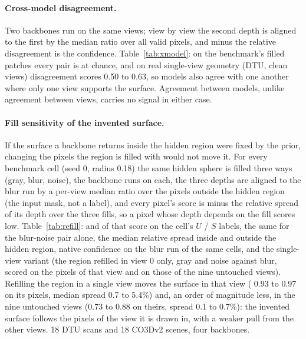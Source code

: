 \begin{table}[h]
\centering
\caption{\textbf{Operating points.} See the paragraph above for the columns.}
\label{tab:bands}
\tiny
\setlength{\tabcolsep}{2pt}
\resizebox{\textwidth}{!}{}
\end{table}

\paragraph{Cross-model disagreement.}
Two backbones run on the same views; view by view the second depth is aligned to the first by the median ratio over all valid pixels, and minus the relative disagreement is the confidence. Table~\ref{tab:xmodel}: on the benchmark's filled patches every pair is at chance, and on real single-view geometry (DTU, clean views) disagreement scores 0.50 to 0.63, so models also agree with one another where only one view supports the surface. Agreement between models, unlike agreement between views, carries no signal in either case.

\begin{table}[h]
\centering
\caption{\textbf{Cross-model disagreement as a detector.} Filled patches: DTU seed 0, blur, radius 0.18 (18 scans); CO3Dv2 blur and noise, seed 0, radius 0.18 (18 scenes). Single-view: the DTU vis protocol pooled over 3, 5 and 10 views. 95\% cluster-bootstrap intervals over scenes.}
\label{tab:xmodel}
\footnotesize
\setlength{\tabcolsep}{4pt}
\resizebox{\textwidth}{!}{}
\end{table}

\paragraph{Fill sensitivity of the invented surface.}
If the surface a backbone returns inside the hidden region were fixed by the prior, changing the pixels the region is filled with would not move it. For every benchmark cell (seed 0, radius 0.18) the same hidden sphere is filled three ways (gray, blur, noise), the backbone runs on each, the three depths are aligned to the blur run by a per-view median ratio over the pixels outside the hidden region (the input mask, not a label), and every pixel's score is minus the relative spread of its depth over the three fills, so a pixel whose depth depends on the fill scores low. Table~\ref{tab:refill}: \auroc{} and \cur{} of that score on the cell's $U$ / $S$ labels, the same for the blur-noise pair alone, the median relative spread inside and outside the hidden region, native confidence on the blur run of the same cells, and the single-view variant (the region refilled in view 0 only, gray and noise against blur, scored on the pixels of that view and on those of the nine untouched views). Refilling the region in a single view moves the surface in that view (\auroc{} 0.93 to 0.97 on its pixels, median spread 0.7 to 5.4\%) and, an order of magnitude less, in the nine untouched views (0.73 to 0.88 on theirs, spread 0.1 to 0.7\%): the invented surface follows the pixels of the view it is drawn in, with a weaker pull from the other views. 18 DTU scans and 18 CO3Dv2 scenes, four backbones.

